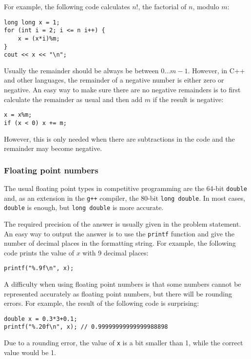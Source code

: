 For example, the following code calculates $n!$,
the factorial of $n$, modulo $m$:
\begin{lstlisting}
long long x = 1;
for (int i = 2; i <= n i++) {
    x = (x*i)%m;
}
cout << x << "\n";
\end{lstlisting}

Usually the remainder should be always
be between $0\ldots m-1$.
However, in C++ and other languages,
the remainder of a negative number
is either zero or negative.
An easy way to make sure there
are no negative remainders is to first calculate
the remainder as usual and then add $m$
if the result is negative:
\begin{lstlisting}
x = x%m;
if (x < 0) x += m;
\end{lstlisting}
However, this is only needed when there
are subtractions in the code and the
remainder may become negative.

\subsubsection{Floating point numbers}


The usual floating point types in
competitive programming are
the 64-bit \texttt{double}
and, as an extension in the \texttt{g++} compiler,
the 80-bit \texttt{long double}.
In most cases, \texttt{double} is enough,
but \texttt{long double} is more accurate.

The required precision of the answer
is usually given in the problem statement.
An easy way to output the answer is to use
the \texttt{printf} function
and give the number of decimal places
in the formatting string.
For example, the following code prints
the value of $x$ with 9 decimal places:

\begin{lstlisting}
printf("%.9f\n", x);
\end{lstlisting}

A difficulty when using floating point numbers
is that some numbers cannot be represented
accurately as floating point numbers,
but there will be rounding errors.
For example, the result of the following code
is surprising:

\begin{lstlisting}
double x = 0.3*3+0.1;
printf("%.20f\n", x); // 0.99999999999999988898
\end{lstlisting}

Due to a rounding error,
the value of \texttt{x} is a bit smaller than 1,
while the correct value would be 1.


